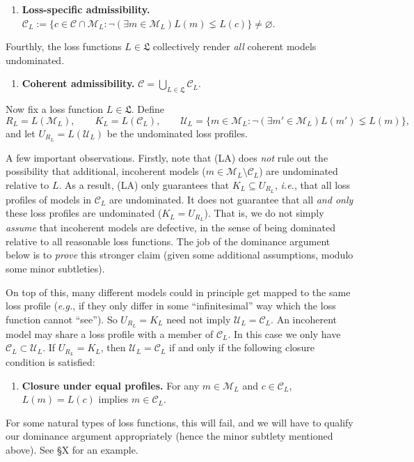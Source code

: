 \documentclass[11pt]{article}
\theoremstyle{definition}
\theoremstyle{remark}
\newcommand{\M}{\mathcal M}
\newcommand{\C}{\mathcal C}
\newcommand{\U}{\mathcal U}
\begin{document}
\begin{enumerate}[label=\textbf{(LA)},leftmargin=*]
\item \textbf{Loss-specific admissibility.} $\C_L:=\{c\in\C\cap\M_L : \neg(\exists m\in\M_L)L(m)\lneq L(c)\}\neq\varnothing$.
\end{enumerate}

Fourthly, the loss functions $L\in\mathfrak L$ collectively render \textit{all} coherent models undominated.


\begin{enumerate}[label=\textbf{(A)},leftmargin=*]
\item \textbf{Coherent admissibility.} $\C=\bigcup_{L\in\mathfrak L}\C_L$.
\end{enumerate}

Now fix a loss function $L\in\mathfrak L$. Define
\[
 R_L=L(\M_L),\qquad K_L=L(\C_L),\qquad
 \U_L=\{m\in\M_L:\neg(\exists m'\in\M_L)L(m')\lneq L(m)\},
\]
and let $U_{R_L}=L(\U_L)$ be the undominated loss profiles.



A few important observations. Firstly, note that (LA) does \textit{not} rule out the possibility that additional, incoherent models ($m\in\M_L\setminus\C_L$) are undominated relative to $L$. As a result, (LA) only guarantees that $K_L\subseteq U_{R_L}$, \textit{i.e.}, that all loss profiles of models in $\C_L$ are undominated. It does not guarantee that all \textit{and only} these loss profiles are undominated ($K_L=U_{R_L}$). That is, we do not simply \textit{assume} that incoherent models are defective, in the sense of being dominated relative to all reasonable loss functions. The job of the dominance argument below is to \textit{prove} this stronger claim (given some additional assumptions, modulo some minor subtleties).




On top of this, many different models could in principle get mapped to the same loss profile (\textit{e.g.}, if they only differ in some ``infinitesimal'' way which the loss function cannot ``see''). So $U_{R_L}=K_L$ need not imply $\U_L=\C_L$. An incoherent model may share a loss profile with a member of $\C_L$. In this case we only have $\C_L\subset \U_L$. If $U_{R_L}=K_L$, then $\U_L=\C_L$ if and only if the following closure condition is satisfied:

\begin{enumerate}[label=\textbf{(C)},leftmargin=*]
\item \textbf{Closure under equal profiles.} For any $m\in \M_L$ and $c\in \C_L$, $L(m)=L(c)$ implies $m\in \C_L$.
\end{enumerate}
For some natural types of loss functions, this will fail, and we will have to qualify our dominance argument appropriately (hence the minor subtlety mentioned above). See \S X for an example.
\end{document}
